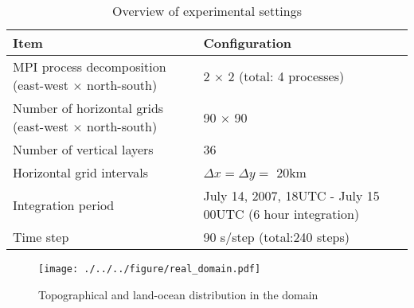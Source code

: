 \begin{table}[tb]
\begin{center}
  \caption{Overview of experimental settings}
  \label{tab:grids}
  \begin{tabularx}{150mm}{|l|X|} \hline
    \rowcolor[gray]{0.9} Item & Configuration \\ \hline
    MPI process decomposition (east-west $\times$ north-south) & 2 $\times$ 2 (total: 4 processes) \\ \hline
    Number of horizontal grids (east-west $\times$ north-south) & 90 $\times$ 90  \\ \hline
    Number of vertical layers   & 36                   \\ \hline
    Horizontal grid intervals   & $\Delta x  = \Delta y = $ 20km       \\ \hline
    Integration period & July 14, 2007, 18UTC - July 15 00UTC (6 hour integration) \\ \hline
    Time step & 90 s/step (total:240 steps) \\ \hline
  \end{tabularx}
\end{center}
\end{table}

\begin{figure}[tb]
\begin{center}
  \texttt{[image: ./../../figure/real\_domain.pdf]}\\
  \caption{Topographical and land-ocean distribution in the domain}
  \label{fig:tutorial_real_domain}
\end{center}
\end{figure}


